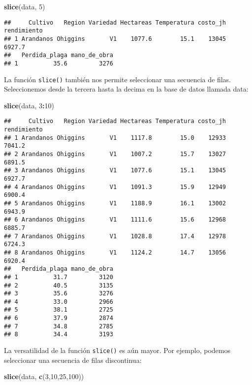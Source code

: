 \documentclass[]{book}
\newenvironment{Shaded}{\begin{snugshade}}{\end{snugshade}}
\newcommand{\DecValTok}[1]{\textcolor[rgb]{0.00,0.00,0.81}{#1}}
\newcommand{\KeywordTok}[1]{\textcolor[rgb]{0.13,0.29,0.53}{\textbf{#1}}}
\newcommand{\NormalTok}[1]{#1}
\newcommand{\OperatorTok}[1]{\textcolor[rgb]{0.81,0.36,0.00}{\textbf{#1}}}
\begin{document}
\begin{Shaded}
\begin{Highlighting}[]
\KeywordTok{slice}\NormalTok{(data, }\DecValTok{5}\NormalTok{)}
\end{Highlighting}
\end{Shaded}

\begin{verbatim}
##     Cultivo   Region Variedad Hectareas Temperatura costo_jh rendimiento
## 1 Arandanos Ohiggins       V1    1077.6        15.1    13045      6927.7
##   Perdida_plaga mano_de_obra
## 1          35.6         3276
\end{verbatim}

La función \texttt{slice()} también nos permite seleccionar una secuencia de filas. Seleccionemos desde la tercera hasta la decima en la base de datos llamada data:

\begin{Shaded}
\begin{Highlighting}[]
\KeywordTok{slice}\NormalTok{(data, }\DecValTok{3}\OperatorTok{:}\DecValTok{10}\NormalTok{)}
\end{Highlighting}
\end{Shaded}

\begin{verbatim}
##     Cultivo   Region Variedad Hectareas Temperatura costo_jh rendimiento
## 1 Arandanos Ohiggins       V1    1117.8        15.0    12933      7041.2
## 2 Arandanos Ohiggins       V1    1007.2        15.7    13027      6891.5
## 3 Arandanos Ohiggins       V1    1077.6        15.1    13045      6927.7
## 4 Arandanos Ohiggins       V1    1091.3        15.9    12949      6900.4
## 5 Arandanos Ohiggins       V1    1188.9        16.1    13002      6943.9
## 6 Arandanos Ohiggins       V1    1111.6        15.6    12968      6885.7
## 7 Arandanos Ohiggins       V1    1028.8        17.4    12978      6724.3
## 8 Arandanos Ohiggins       V1    1124.2        14.7    13056      6920.4
##   Perdida_plaga mano_de_obra
## 1          31.7         3120
## 2          40.5         3135
## 3          35.6         3276
## 4          33.0         2966
## 5          38.1         2725
## 6          37.9         2874
## 7          34.8         2785
## 8          34.4         3193
\end{verbatim}

La versatilidad de la función \texttt{slice()} es aún mayor. Por ejemplo, podemos seleccionar una secuencia de filas
discontinua:

\begin{Shaded}
\begin{Highlighting}[]
\KeywordTok{slice}\NormalTok{(data, }\KeywordTok{c}\NormalTok{(}\DecValTok{3}\NormalTok{,}\DecValTok{10}\NormalTok{,}\DecValTok{25}\NormalTok{,}\DecValTok{100}\NormalTok{))}
\end{Highlighting}
\end{Shaded}
\end{document}
